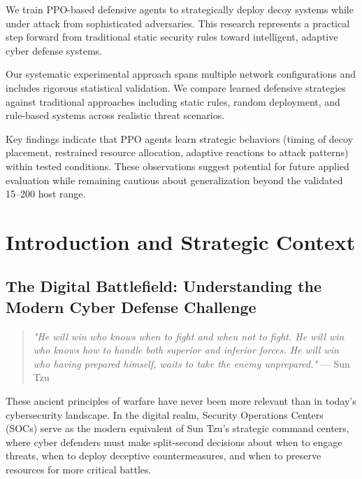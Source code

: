\documentclass[12pt,oneside,a4paper]{article}
\theoremstyle{definition}
\theoremstyle{plain}
\begin{document}
We train PPO-based defensive agents \citep{schulman2017proximal} to strategically deploy decoy systems while under attack from sophisticated adversaries. This research represents a practical step forward from traditional static security rules toward intelligent, adaptive cyber defense systems.

Our systematic experimental approach spans multiple network configurations and includes rigorous statistical validation. We compare learned defensive strategies against traditional approaches including static rules, random deployment, and rule-based systems across realistic threat scenarios.

Key findings indicate that PPO agents learn strategic behaviors (timing of decoy placement, restrained resource allocation, adaptive reactions to attack patterns) within tested conditions. These observations suggest potential for future applied evaluation while remaining cautious about generalization beyond the validated 15--200 host range.

\clearpage

\setcounter{page}{1}
\pagestyle{fancy}
\fancyhf{}
\fancyfoot[C]{\thepage}

\clearpage

\section{Introduction and Strategic Context}

\subsection{The Digital Battlefield: Understanding the Modern Cyber Defense Challenge}

\begin{quotation}
\textit{"He will win who knows when to fight and when not to fight. He will win who knows how to handle both superior and inferior forces. He will win who having prepared himself, waits to take the enemy unprepared."} — Sun Tzu \citep{tzu2005art}
\end{quotation}

These ancient principles of warfare have never been more relevant than in today's cybersecurity landscape. In the digital realm, Security Operations Centers (SOCs) serve as the modern equivalent of Sun Tzu's strategic command centers, where cyber defenders must make split-second decisions about when to engage threats, when to deploy deceptive countermeasures, and when to preserve resources for more critical battles.
\end{document}

